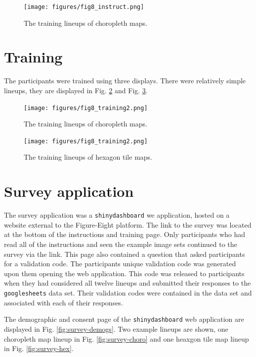 \documentclass{monashthesis}
\begin{document}
\begin{figure}[H]
\centering
\texttt{[image: figures/fig8\_instruct.png]}
\caption{\label{fig:instruct}The training lineups of choropleth maps.}
\end{figure}

\hypertarget{training}{%
\section{Training}\label{training}}

The participants were trained using three displays. There were relatively simple lineups, they are displayed in Fig. \ref{fig:training1} and Fig. \ref{fig:training2}.

\begin{figure}[H]
\centering
\texttt{[image: figures/fig8\_training2.png]}
\caption{\label{fig:training1}The training lineups of choropleth maps.}
\end{figure}

\begin{figure}[H]
\centering
\texttt{[image: figures/fig8\_training2.png]}
\caption{\label{fig:training2}The training lineups of hexagon tile maps.}
\end{figure}

\hypertarget{survey-application}{%
\section{Survey application}\label{survey-application}}

The survey application was a \texttt{shinydashboard} we application, hosted on a website external to the Figure-Eight platform. The link to the survey was located at the bottom of the instructions and training page. Only participants who had read all of the instructions and seen the example image sets continued to the survey via the link.
This page also contained a question that asked participants for a validation code. The participants unique validation code was generated upon them opening the web application. This code was released to participants when they had considered all twelve lineups and submitted their responses to the \texttt{googlesheets} data set. Their validation codes were contained in the data set and associated with each of their responses.

The demographic and consent page of the \texttt{shinydashboard} web application are displayed in Fig. \ref{fig:survey-demogs}. Two example lineups are shown, one choropleth map lineup in Fig. \ref{fig:survey-choro} and one heaxgon tile map lineup in Fig. \ref{fig:survey-hex}.
\end{document}
